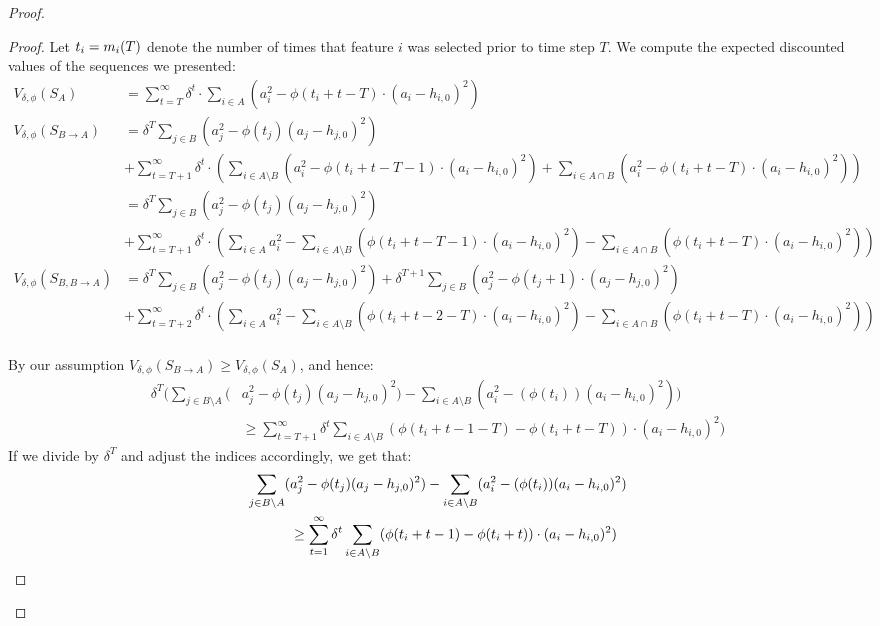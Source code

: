 \begin{proof}
\begin{proof}
	Let $t_i=m_{i}(T)$ denote the number of times that feature $i$ was selected prior to time step $T$. We compute the expected discounted values of the sequences we presented:
	\begin{align*}
		V_{\delta,\phi}(S_A) &= \sum_{t=T}^\infty \delta^t \cdot \sum_{i \in A} (a_i^2 - \phi(t_i+t-T)\cdot(a_i-h_{i,0})^2) \\
		V_{\delta,\phi}(S_{B \rightarrow A}) &= \delta^T \sum_{j \in B}(a_j^2 - \phi(t_j)(a_j-h_{j,0})^2) \\
		&+ \sum_{t=T+1}^\infty \delta^t \cdot \left( \sum_{i \in A \setminus B} (a_i^2 - \phi(t_i+t-T-1)\cdot(a_i-h_{i,0})^2)+ \sum_{i \in A \cap B} (a_i^2 - \phi(t_i+t-T)\cdot(a_i-h_{i,0})^2) \right) \\
		& = \delta^T \sum_{j \in B}(a_j^2 - \phi(t_j)(a_j-h_{j,0})^2)\\
		&+ \sum_{t=T+1}^\infty \delta^t \cdot \left( \sum_{i \in A} a_i^2 -\sum_{i \in A \setminus B} ( \phi(t_i+t-T-1)\cdot(a_i-h_{i,0})^2)-\sum_{i \in A \cap B} ( \phi(t_i+t-T)\cdot(a_i-h_{i,0})^2) \right) \\
		V_{\delta,\phi}(S_{B,B\rightarrow A}) & = \delta^T \sum_{j \in B}(a_j^2 - \phi(t_j)(a_j-h_{j,0})^2)+ \delta^{T+1} \sum_{j \in B}(a_j^2 - \phi(t_j+1)\cdot(a_j-h_{j,0})^2) \\
		&+ \sum_{t=T+2}^\infty \delta^t \cdot \left( \sum_{i \in A} a_i^2 -\sum_{i \in A \setminus B} ( \phi(t_i+t-2-T)\cdot(a_i-h_{i,0})^2)-\sum_{i \in A \cap B} ( \phi(t_i+t-T)\cdot(a_i-h_{i,0})^2) \right) \\
	\end{align*}

	By our assumption $V_{\delta,\phi}(S_{B \rightarrow A}) \geq V_{\delta,\phi}(S_A)$, and hence:
	\begin{align*}
		\delta^T(\sum_{j \in B\setminus A}(&a_j^2 - \phi(t_j)(a_j-h_{j,0})^2)-\sum_{i \in A\setminus B}(a_i^2 - (\phi(t_i))(a_i-h_{i,0})^2)) \\
		&\geq     \sum_{t=T+1}^\infty \delta^t\sum_{i \in A \setminus B} (\phi(t_i+t-1-T)-\phi(t_i+t-T))\cdot(a_i-h_{i,0})^2) 
	\end{align*}
	If we divide by $\delta^T$ and adjust the indices accordingly, we get that:
	\begin{align} \label{eq:BA}
		\sum_{j \in B\setminus A}(&a_j^2 - \phi(t_j)(a_j-h_{j,0})^2)-\sum_{i \in A\setminus B}(a_i^2 - (\phi(t_i))(a_i-h_{i,0})^2) \\
		&\geq   \sum_{t=1}^\infty \delta^t\sum_{i \in A \setminus B} (\phi(t_i+t-1)-\phi(t_i+t))\cdot(a_i-h_{i,0})^2) \notag
	\end{align}
	

\end{proof}
\end{proof}
